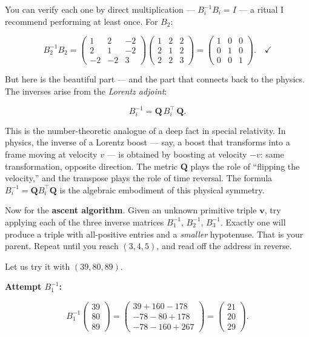 You can verify each one by direct multiplication --- \(B_i^{-1} B_i = I\) --- a ritual I recommend performing at least once. For \(B_2\):

\[B_2^{-1} B_2 = \begin{pmatrix} 1 & 2 & -2 \\ 2 & 1 & -2 \\ -2 & -2 & 3 \end{pmatrix} \begin{pmatrix} 1 & 2 & 2 \\ 2 & 1 & 2 \\ 2 & 2 & 3 \end{pmatrix} = \begin{pmatrix} 1 & 0 & 0 \\ 0 & 1 & 0 \\ 0 & 0 & 1 \end{pmatrix}. \quad \checkmark\]

But here is the beautiful part --- and the part that connects back to the physics. The inverses arise from the \emph{Lorentz adjoint}:

\[B_i^{-1} = \mathbf{Q} \, B_i^\top \, \mathbf{Q}.\]

This is the number-theoretic analogue of a deep fact in special relativity. In physics, the inverse of a Lorentz boost --- say, a boost that transforms into a frame moving at velocity \(v\) --- is obtained by boosting at velocity \(-v\): same transformation, opposite direction. The metric \(\mathbf{Q}\) plays the role of ``flipping the velocity,'' and the transpose plays the role of time reversal. The formula \(B_i^{-1} = \mathbf{Q} B_i^\top \mathbf{Q}\) is the algebraic embodiment of this physical symmetry.

Now for the \textbf{ascent algorithm}. Given an unknown primitive triple \(\mathbf{v}\), try applying each of the three inverse matrices \(B_1^{-1}\), \(B_2^{-1}\), \(B_3^{-1}\). Exactly one will produce a triple with all-positive entries and a \emph{smaller} hypotenuse. That is your parent. Repeat until you reach \((3, 4, 5)\), and read off the address in reverse.

Let us try it with \((39, 80, 89)\).

\textbf{Attempt \(B_1^{-1}\):}

\[B_1^{-1} \begin{pmatrix} 39 \\ 80 \\ 89 \end{pmatrix} = \begin{pmatrix} 39 + 160 - 178 \\ -78 - 80 + 178 \\ -78 - 160 + 267 \end{pmatrix} = \begin{pmatrix} 21 \\ 20 \\ 29 \end{pmatrix}.\]

